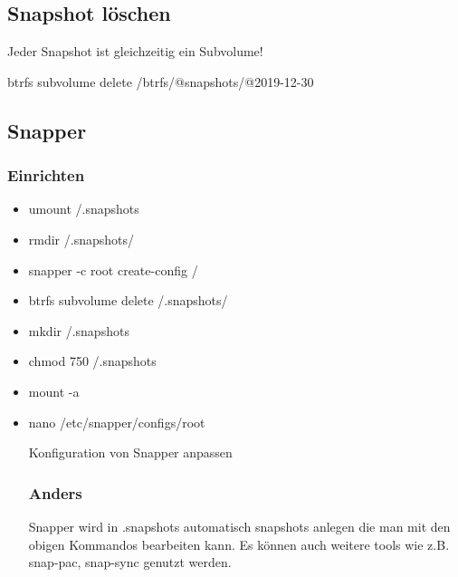 \documentclass[11pt,a4paper]{article}
\begin{document}
\subsection{Snapshot löschen}
Jeder Snapshot ist gleichzeitig ein Subvolume!

btrfs subvolume delete /btrfs/@snapshots/@2019-12-30

\subsection{Snapper}
\subsubsection{Einrichten}
\begin{itemize}
\item umount /.snapshots
\item rmdir /.snapshots/
\item snapper -c root create-config /
\item btrfs subvolume delete /.snapshots/
\item mkdir /.snapshots
\item chmod 750 /.snapshots
\item mount -a
\item nano /etc/snapper/configs/root

Konfiguration von Snapper anpassen
\subsubsection{Anders}
Snapper wird in .snapshots automatisch snapshots anlegen die man mit den obigen Kommandos bearbeiten kann.
Es können auch weitere tools wie z.B. snap-pac, snap-sync genutzt werden.
\end{itemize}
\end{document}
